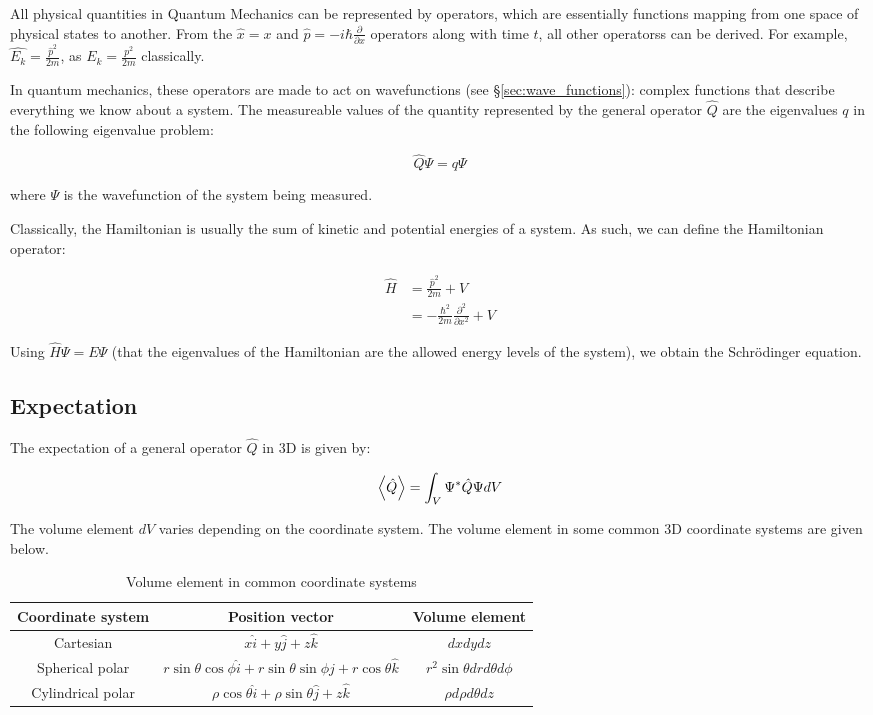 
All physical quantities in Quantum Mechanics can be represented by operators, which are essentially functions mapping from one space of physical states to another. From the $\hat{x} = x$ and $\hat{p} = -i\hbar\frac{\partial}{\partial x}$ operators along with time $t$, all other operatorss can be derived. For example, $\hat{E_k} = \frac{\hat{p}^2}{2m}$, as $E_k = \frac{p^2}{2m}$ classically. 

In quantum mechanics, these operators are made to act on wavefunctions (see §\ref{sec:wave_functions}): complex functions that describe everything we know about a system. The measureable values of the quantity represented by the general operator $\hat{Q}$ are the eigenvalues $q$ in the following eigenvalue problem:

\[ \hat{Q}\Psi = q\Psi \]

where $\Psi$ is the wavefunction of the system being measured. 

Classically, the Hamiltonian is usually the sum of kinetic and potential energies of a system. As such, we can define the Hamiltonian operator:

\begin{align*} 
\hat{H} &= \frac{\hat{p}^2}{2m} + V  \\
&= -\frac{\hbar^2}{2m} \frac{\partial^2}{\partial x^2} + V
\end{align*}

Using $\hat{H}{\Psi} = E\Psi$ (that the eigenvalues of the Hamiltonian are the allowed energy levels of the system), we obtain the Schr\"odinger equation. 


\subsection{Expectation}

The expectation of a general operator $\hat{Q}$ in 3D is given by:

\[ \expval{\hat{Q}} = \int_{V} \Psi^*\hat{Q}\Psi dV \]

The volume element $dV$ varies depending on the coordinate system. The volume element in some common 3D coordinate systems are given below. 

\begin{table}[h!]
\centering
	\begin{tabular}{c|c|c}
	Coordinate system & Position vector & Volume element \\ \hline
	Cartesian & $x\hat{i} + y\hat{j} + z\hat{k}$ & $dxdydz$ \\
	Spherical polar & $r\sin{\theta}\cos{\phi}\hat{i} + r\sin{\theta}\sin{\phi}\hat{j} + r\cos{\theta}\hat{k}$ & $r^2\sin{\theta}drd\theta d\phi$ \\
	Cylindrical polar & $\rho\cos{\theta}\hat{i} + \rho\sin{\theta}\hat{j} + z\hat{k}$ & $\rho d\rho d\theta dz$
	\end{tabular}
	\caption{Volume element in common coordinate systems}
\end{table}

